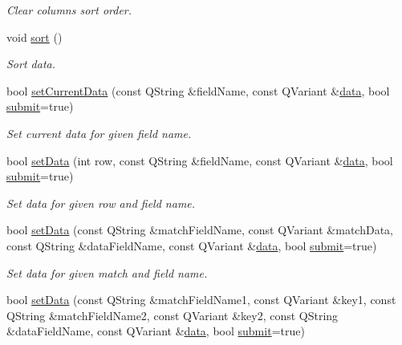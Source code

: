 \begin{DoxyCompactItemize}
\begin{DoxyCompactList}\small\item\em Clear columns sort order. \end{DoxyCompactList}\item 
void \hyperlink{classmdt_abstract_sql_table_controller_a47b1eedbfc74c5d80649350f801ad46d}{sort} ()
\begin{DoxyCompactList}\small\item\em Sort data. \end{DoxyCompactList}\item 
bool \hyperlink{classmdt_abstract_sql_table_controller_a2e7ec06d9148018d5fbeb4451bfe0780}{set\-Current\-Data} (const Q\-String \&field\-Name, const Q\-Variant \&\hyperlink{classmdt_abstract_sql_table_controller_a1801a01c0ce073c2e389b20f58a3d3ff}{data}, bool \hyperlink{classmdt_abstract_sql_table_controller_a14f3e2a91fc30ca0e018944f4f95bc33}{submit}=true)
\begin{DoxyCompactList}\small\item\em Set current data for given field name. \end{DoxyCompactList}\item 
bool \hyperlink{classmdt_abstract_sql_table_controller_abe56526399b9d9b0ab68139539ec616c}{set\-Data} (int row, const Q\-String \&field\-Name, const Q\-Variant \&\hyperlink{classmdt_abstract_sql_table_controller_a1801a01c0ce073c2e389b20f58a3d3ff}{data}, bool \hyperlink{classmdt_abstract_sql_table_controller_a14f3e2a91fc30ca0e018944f4f95bc33}{submit}=true)
\begin{DoxyCompactList}\small\item\em Set data for given row and field name. \end{DoxyCompactList}\item 
bool \hyperlink{classmdt_abstract_sql_table_controller_a3e694e6dab9c883f1a276787a3723086}{set\-Data} (const Q\-String \&match\-Field\-Name, const Q\-Variant \&match\-Data, const Q\-String \&data\-Field\-Name, const Q\-Variant \&\hyperlink{classmdt_abstract_sql_table_controller_a1801a01c0ce073c2e389b20f58a3d3ff}{data}, bool \hyperlink{classmdt_abstract_sql_table_controller_a14f3e2a91fc30ca0e018944f4f95bc33}{submit}=true)
\begin{DoxyCompactList}\small\item\em Set data for given match and field name. \end{DoxyCompactList}\item 
bool \hyperlink{classmdt_abstract_sql_table_controller_a5ada88efd957fafc665feb050f278059}{set\-Data} (const Q\-String \&match\-Field\-Name1, const Q\-Variant \&key1, const Q\-String \&match\-Field\-Name2, const Q\-Variant \&key2, const Q\-String \&data\-Field\-Name, const Q\-Variant \&\hyperlink{classmdt_abstract_sql_table_controller_a1801a01c0ce073c2e389b20f58a3d3ff}{data}, bool \hyperlink{classmdt_abstract_sql_table_controller_a14f3e2a91fc30ca0e018944f4f95bc33}{submit}=true)

\end{DoxyCompactItemize}
